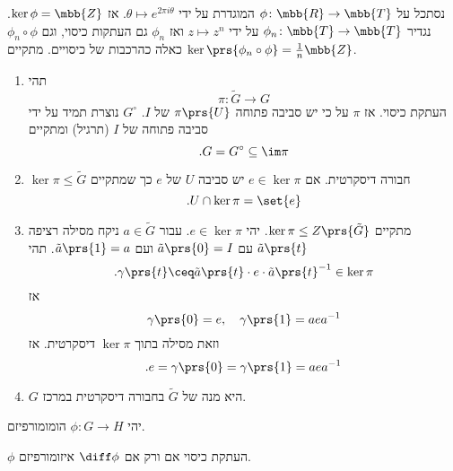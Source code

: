 \documentclass[10pt, twoside]{book}
\begin{document}
\begin{example}
נסתכל על
$\phi \colon \mbb{R} \to \mbb{T}$
המוגדרת על ידי
$\theta \mapsto e^{2 \pi i \theta}$.
אז
$\ker \phi = \mbb{Z}$.
נגדיר
$\phi_n \colon \mbb{T} \to \mbb{T}$
על ידי
$z \mapsto z^n$
ואז
$\phi_n$
גם העתקות כיסוי, וגם
$\phi_n \circ \phi$
כאלה כהרכבות של כיסויים. מתקיים
$\ker \prs{\phi_n \circ \phi} = \frac{1}{n} \mbb{Z}$.
\end{example}

\begin{proposition}
\begin{enumerate}
\item תהי
\[\pi \colon \tilde{G} \to G\]
העתקת כיסוי. אז
$\pi$
על כי יש סביבה פתוחה
$\pi\prs{U}$
של
$I$.
$G^\circ$
נוצרת תמיד על ידי סביבה פתוחה של
$I$ (תרגיל)
ומתקיים
\[\text{.} G = G^\circ \subseteq \im \pi\]

\item
$\ker \pi \leq \tilde{G}$
חבורה דיסקרטית. אם
$e \in \ker \pi$
יש סביבה
$U$
של
$e$
כך שמתקיים
\[\text{.} U \cap \ker \pi = \set{e}\]

\item מתקיים
$\ker \pi \leq Z\prs{\tilde{G}}$.
יהי
$e \in \ker \pi$.
 עבור
 $a \in \tilde{G}$
 ניקח מסילה רציפה
$\tilde{a}\prs{t}$
עם
$\tilde{a}\prs{0} = I$
ועם
$\tilde{a} \prs{1} = a$.
תהי
\[\text{.} \gamma\prs{t} \ceq \tilde{a}\prs{t} \cdot e \cdot \tilde{a}\prs{t}^{-1} \in \ker \pi\]
אז
\[\gamma\prs{0} = e, \quad \gamma\prs{1} = aea^{-1}\]
וזאת מסילה בתוך
$\ker \pi$
דיסקרטית.
אז
\[\text{.} e = \gamma\prs{0} = \gamma\prs{1} = aea^{-1}\]

\item $G$
היא מנה של
$\tilde{G}$
בחבורה דיסקרטית במרכז.
\end{enumerate}
\end{proposition}

\begin{lemma}
יהי
$\phi \colon G \to H$
הומומורפיזם.

$\phi$
העתקת כיסוי אם ורק אם
$\diff \phi$
איזומורפיזם.
\end{lemma}
\end{document}
